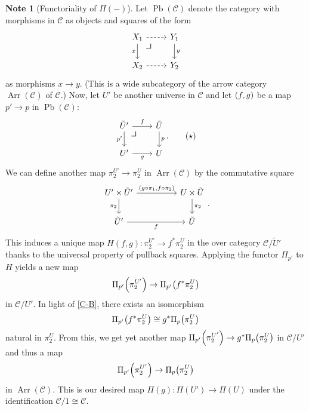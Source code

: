 \documentclass[10pt,letterpaper,cm]{nupset}
\theoremstyle{definition}
\newtheorem{note}[definition]{Note}
\theoremstyle{theorem}
\theoremstyle{remark}
\newcommand{\0}{\mathbf{0}}
\newcommand{\1}{\mathbf{1}}
\newcommand{\2}{\mathbf{2}}
\DeclareMathOperator{\Ar}{Arr}
\DeclareMathOperator{\pb}{Pb}
\renewcommand{\c}{\mathscr{C}}
\begin{document}
\begin{note}[Functoriality of $\Pi({-})$]\label{Ufunct}
Let $\pb(\c)$ denote the category with morphisms in $\c$ as objects and squares of the form 
\[
\begin{tikzcd}
X_1 \arrow[d, "x"'] \arrow[r, dashed]  \arrow[dr, phantom, "\scalebox{1.5}{\color{black}$\lrcorner$}", very near start] & Y_1 \arrow[d, "y"]  \\
X_2 \arrow[r, dashed]                & Y_2               
\end{tikzcd}
\]
 as morphisms $x\to y$.  (This is a wide subcategory of the arrow category $\Ar(\c)$ of $\c$.) Now, let $U'$ be another universe in $\c$ and let $\mleft(f, g\mright)$ be a map $p' \to p$ in $\pb(\c)$:
\[
\label{eqn:pbk} \begin{tikzcd}
\tilde{U}' \arrow[d, "p'"'] \arrow[r, "f"]  \arrow[dr, phantom, "\scalebox{1.5}{\color{black}$\lrcorner$}", very near start] & \tilde{U} \arrow[d, "p"] \\
U' \arrow[r, "g"']                         & U                       
\end{tikzcd}. \tag{$\star$}
\]
We can define another map $\pi_2^{U'} \to \pi_2^U$ in $\Ar(\c)$ by the commutative square  
\[
\begin{tikzcd}[column sep=huge]
U'\times \tilde{U}' \arrow[d, "\pi_2"'] \arrow[r, "{\mleft(g\circ \pi_1, f \circ \pi_2\mright)}"] & U\times \tilde{U} \arrow[d, "\pi_2"] \\
\tilde{U}' \arrow[r, "f"']                                                                      & \tilde{U}                           
\end{tikzcd}
.\] This induces a unique map $H(f,g): \pi_2^{U'} \to f^{\ast}{\pi_2^U}$ in the over category $\c/\tilde{U}'$ thanks to the universal property of pullback squares. Applying the functor $\Pi_{p'}$ to $H$ yields a new map 
$$ \Pi_{p'}\mleft(\pi_2^{U'}\mright) \to \Pi_{p'}\mleft(f^{\ast}{\pi_2^U}\mright) $$ 
in $\c/U'$. In light of \cref{C-B}, there exists an isomorphism  $$\Pi_{p'}\mleft(f^{\ast}{\pi_2^U}\mright) \cong g^{\ast}\Pi_p\mleft( \pi_2^U\mright)$$ natural in $\pi_2^U$. From this, we get yet another map $ \Pi_{p'}\mleft(\pi_2^{U'}\mright) \to  g^{\ast}\Pi_p\mleft(\pi_2^U\mright)$ in $\c/U'$ and thus a map $$\Pi_{p'}\mleft(\pi_2^{U'}\mright) \to \Pi_p\mleft(\pi_2^U\mright)$$ in $\Ar(\c)$. This is our desired map $\Pi(g): \Pi(U') \to \Pi(U) $ under the identification $\c/1 \cong \c$. 
\end{note}

\medskip
\end{document}

